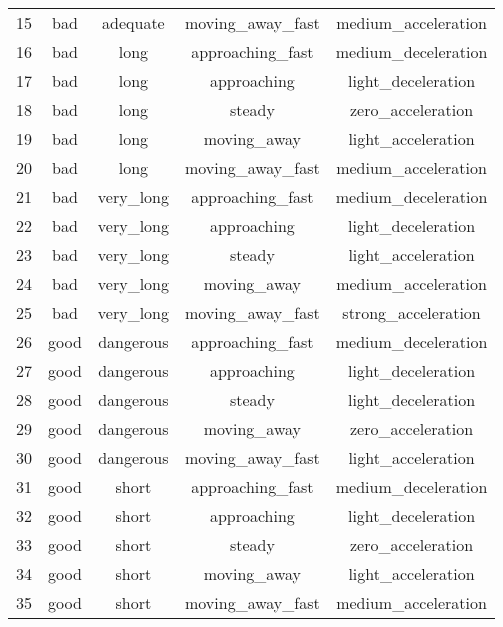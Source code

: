 \begin{table}[!htbp]
{\begin{tabular}{|c|c|c|c|c|}
            15 & bad  & adequate    & moving\_away\_fast   & medium\_acceleration \\
            16 & bad  & long        & approaching\_fast     & medium\_deceleration \\
            17 & bad  & long        & approaching          & light\_deceleration \\
            18 & bad  & long        & steady               & zero\_acceleration \\
            19 & bad  & long        & moving\_away         & light\_acceleration \\
            20 & bad  & long        & moving\_away\_fast   & medium\_acceleration \\
            21 & bad  & very\_long  & approaching\_fast     & medium\_deceleration \\
            22 & bad  & very\_long  & approaching          & light\_deceleration \\
            23 & bad  & very\_long  & steady               & light\_acceleration \\
            24 & bad  & very\_long  & moving\_away         & medium\_acceleration \\
            25 & bad  & very\_long  & moving\_away\_fast   & strong\_acceleration \\
            26 & good & dangerous   & approaching\_fast     & medium\_deceleration \\
            27 & good & dangerous   & approaching          & light\_deceleration \\
            28 & good & dangerous   & steady               & light\_deceleration \\
            29 & good & dangerous   & moving\_away         & zero\_acceleration \\
            30 & good & dangerous   & moving\_away\_fast   & light\_acceleration \\
            31 & good & short       & approaching\_fast     & medium\_deceleration \\
            32 & good & short       & approaching          & light\_deceleration \\
            33 & good & short       & steady               & zero\_acceleration \\
            34 & good & short       & moving\_away         & light\_acceleration \\
            35 & good & short       & moving\_away\_fast   & medium\_acceleration \\

\end{tabular}}
\end{table}
